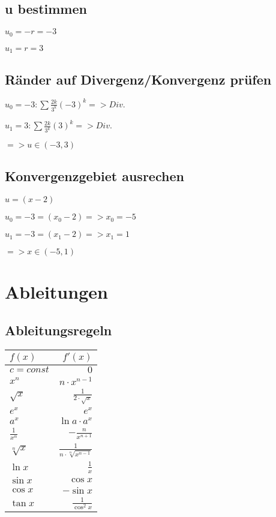 \documentclass[a4paper, 11pt]{article}
\begin{document}
\subsection { u bestimmen}

$u_0 = -r = -3$

$u_1 =  r = 3$

\subsection { Ränder auf Divergenz/Konvergenz prüfen}

$u_0 = -3: \sum \frac{2k} {3^k} (-3)^k => Div.$

$u_1 = 3: \sum \frac{2k} {3^k} (3)^k => Div.$    

$=> u \in (-3, 3)$

\subsection { Konvergenzgebiet ausrechen}

$u = (x - 2)$

$u_0 = -3 = (x_0 - 2) => x_0 = -5$

$u_1 = -3 = (x_1 - 2) => x_1 = 1$

$=> x \in (-5, 1)$ 


\section{Ableitungen}

\subsection{Ableitungsregeln}
\renewcommand{\arraystretch}{1.5}

\begin{tabular}{l | r} 
	$f(x)$ & $f'(x)$\\
	\hline 
	$c = const$ & $0$\\ 
	$x^n$ & $n \cdot x^{n-1}$\\
	$\sqrt{x}$ & $\frac{1}{2\cdot\sqrt{x}}$\\
	$e^x$ & $e^x$\\
	$a^x$ & $\ln{a} \cdot a^x$\\
	$\frac{1}{x^n}$ & $- \frac{n}{x^{n+1}}$\\
	$\sqrt[n]{x}$ & $\frac{1}{n \cdot \sqrt[n]{x^{n-1}}}$\\
	$\ln{x}$ & $\frac{1}{x}$\\
	$\sin{x}$ & $\cos{x}$\\
	$\cos{x}$ & $-\sin{x}$\\
	$\tan{x}$ & $\frac{1}{\cos^2{x}}$\\
\end{tabular} \newpage
\end{document}
